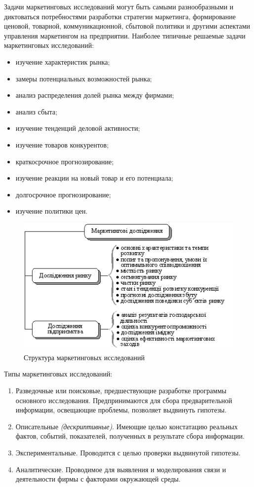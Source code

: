 \documentclass[a4paper,12pt,oneside,final]{extarticle}
\makeatletter
\numberwithin{equation}{section}
\def\maxwidth#1{\ifdim\Gin@nat@width>#1 #1\else\Gin@nat@width\fi}
\makeatother
\begin{document}
\begin{enumerate}
Задачи маркетинговых исследований могут быть самыми разнообразными и диктоваться потребностями разработки стратегии маркетинга, формирование ценовой, товарной, коммуникационной, сбытовой политики и другими аспектами управления маркетингом на предприятии. 
Наиболее типичные решаемые задачи маркетинговых исследований:
\begin{itemize}
	\item изучение характеристик рынка;
	\item замеры потенциальных возможностей рынка;
	\item анализ распределения долей рынка между фирмами;
	\item анализ сбыта;
	\item изучение тенденций деловой активности;
	\item изучение товаров конкурентов;
	\item краткосрочное прогнозирование;
	\item изучение реакции на новый товар и его потенциала;
	\item долгосрочное прогнозирование;
	\item изучение политики цен.
\end{itemize}

\begin{figure}[h]
	\centering
	\includegraphics[width=\maxwidth{\textwidth}]{management-figures/marketing_structure}
	\caption{Структура маркетинговых исследований}
\end{figure}

Типы маркетинговых исследований:
\begin{enumerate}
	\item Разведочные или поисковые, предшествующие разработке программы основного исследования. 
	Предпринимаются для сбора предварительной информации, освещающие проблемы, позволяет выдвинуть гипотезы.
	\item Описательные \textit{(дескриптивные)}. 
	Имеющие целью констатацию реальных фактов, событий, показателей, полученных в результате сбора информации. 
	\item Экспериментальные. 
	Проводится с целью проверки выдвинутой гипотезы.
	\item Аналитические. 
	Проводимое для выявления и моделирования связи и деятельности фирмы с факторами окружающей среды. 
\end{enumerate}


\end{enumerate}
\end{document}
